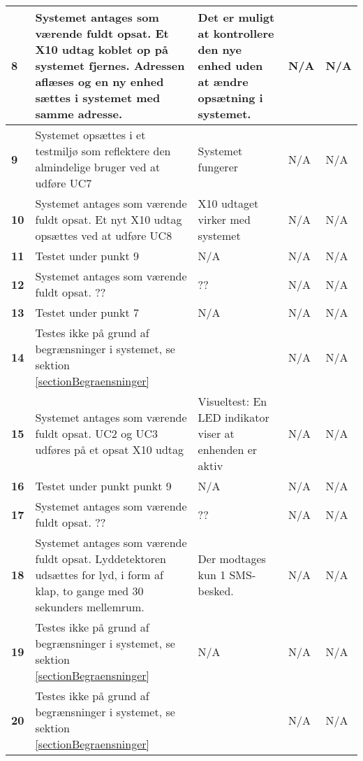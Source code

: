 \begin{center}
\begin{longtable}{|p{}|p{}|p{}|p{}|p{}|}
\textbf{8} &
Systemet antages som værende fuldt opsat.\newline
Et X10 udtag koblet op på systemet fjernes. Adressen aflæses og en ny enhed sættes i systemet med samme adresse.&
Det er muligt at kontrollere den nye enhed uden at ændre opsætning i systemet.&
N/A &
N/A \\\hline

\textbf{9} &
Systemet opsættes i et testmiljø som reflektere den almindelige bruger ved at udføre UC7&
Systemet fungerer&
N/A &
N/A \\\hline

\textbf{10} &
Systemet antages som værende fuldt opsat.\newline
Et nyt X10 udtag opsættes ved at udføre UC8 &
X10 udtaget virker med systemet&
N/A &
N/A \\\hline

\textbf{11} &
Testet under punkt 9&
N/A &
N/A &
N/A \\\hline

\textbf{12} &
Systemet antages som værende fuldt opsat.\newline
??&
??&
N/A &
N/A \\\hline

\textbf{13} &
Testet under punkt 7&
N/A &
N/A &
N/A \\\hline

\textbf{14} &
Testes ikke på grund af begrænsninger i systemet, se sektion \ref{sectionBegraensninger}&
&
N/A &
N/A \\\hline

\textbf{15} &
Systemet antages som værende fuldt opsat.\newline
UC2 og UC3 udføres på et opsat X10 udtag&
Visueltest: En LED indikator viser at enhenden er aktiv&
N/A &
N/A \\\hline

\textbf{16} &
Testet under punkt punkt 9&
N/A &
N/A &
N/A \\\hline

\textbf{17} &
Systemet antages som værende fuldt opsat.\newline
??&
??&
N/A &
N/A \\\hline

\textbf{18} &
Systemet antages som værende fuldt opsat.\newline
Lyddetektoren udsættes for lyd, i form af klap, to gange med 30 sekunders mellemrum.&
Der modtages kun 1 SMS-besked.&
N/A &
N/A \\\hline

\textbf{19} &
Testes ikke på grund af begrænsninger i systemet, se sektion \ref{sectionBegraensninger}&
N/A &
N/A &
N/A \\\hline

\textbf{20} &
Testes ikke på grund af begrænsninger i systemet, se sektion \ref{sectionBegraensninger}&
&
N/A &
N/A \\\hline



	\end{longtable}
	\label{IKFUNK} 
\end{center}
